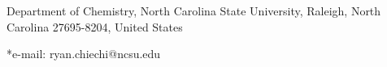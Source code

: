 \begin{affiliations}
 	\item Department of Chemistry, North Carolina State University, Raleigh, North
Carolina 27695-8204, United States
	\item[] *e-mail: ryan.chiechi@ncsu.edu
\end{affiliations}
